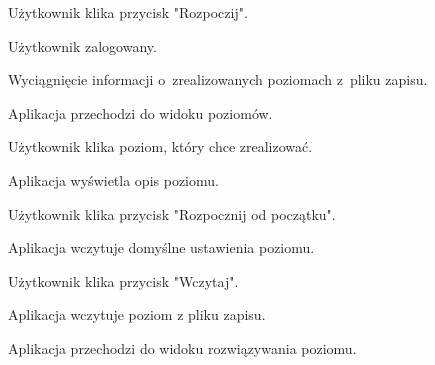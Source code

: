 \documentclass[12pt,a4paper]{article} %
\begin{document}
\hfill \break
\begin{usecase}
	\noaka
	\addpath
	\begin{usecases}
		\item Użytkownik klika przycisk "Rozpoczij".
		\begin{usecases}
			\item Użytkownik zalogowany.
			\begin{usecases}
				\item Wyciągnięcie informacji o~zrealizowanych poziomach z~pliku zapisu.
			\end{usecases}
		\end{usecases}
		\item Aplikacja przechodzi do widoku poziomów.
		\item Użytkownik klika poziom, który chce zrealizować.
		\item Aplikacja wyświetla opis poziomu.
		\begin{usecases}
			\item Użytkownik klika przycisk "Rozpocznij od początku".
			\begin{usecases}
				\item Aplikacja wczytuje domyślne ustawienia poziomu.
			\end{usecases}
			\item Użytkownik klika przycisk "Wczytaj".
			\begin{usecases}
				\item Aplikacja wczytuje poziom z pliku zapisu.
			\end{usecases}
		\end{usecases}
		\item Aplikacja przechodzi do widoku rozwiązywania poziomu.
	\end{usecases}
\end{usecase}
\end{document}
